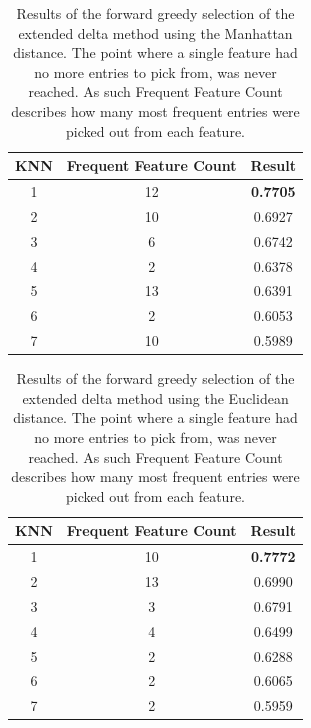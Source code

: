 \begin{table}
\centering
\begin{tabular}{|c|c|c|}
\hline
KNN & Frequent Feature Count & Result          \\ \hline
1   & 12                     & \textbf{0.7705} \\ \hline
2   & 10                     & 0.6927          \\ \hline
3   & 6                      & 0.6742          \\ \hline
4   & 2                      & 0.6378          \\ \hline
5   & 13                     & 0.6391          \\ \hline
6   & 2                      & 0.6053          \\ \hline
7   & 10                     & 0.5989          \\ \hline
\end{tabular}
\caption{Results of the forward greedy selection of the extended delta method
using the Manhattan distance. The point where a single feature had no more
entries to pick from, was never reached. As such Frequent Feature Count
describes how many most frequent entries were picked out from each feature.}
\label{fig:resultsMan}
\end{table}

\begin{table}[]
\centering
\begin{tabular}{|c|c|c|}
\hline
KNN & Frequent Feature Count & Result          \\ \hline
1   & 10                     & \textbf{0.7772} \\ \hline
2   & 13                     & 0.6990          \\ \hline
3   & 3                      & 0.6791          \\ \hline
4   & 4                      & 0.6499          \\ \hline
5   & 2                      & 0.6288          \\ \hline
6   & 2                      & 0.6065          \\ \hline
7   & 2                      & 0.5959          \\ \hline
\end{tabular}
\caption{Results of the forward greedy selection of the extended delta method
using the Euclidean distance. The point where a single feature had no more
entries to pick from, was never reached. As such Frequent Feature Count
describes how many most frequent entries were picked out from each feature.}
\label{fig:resultsEuc}
\end{table}

